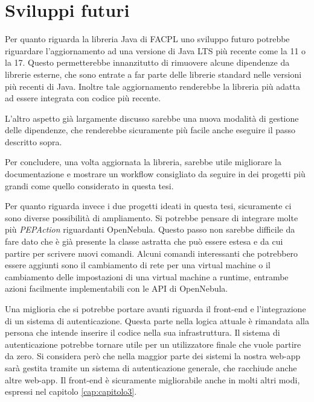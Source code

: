\section{Sviluppi futuri}
Per quanto riguarda la libreria Java di FACPL uno sviluppo futuro potrebbe riguardare l'aggiornamento ad una versione di Java LTS più recente come la 11 o la 17. Questo permetterebbe innanzitutto di rimuovere alcune dipendenze da librerie esterne, che sono entrate a far parte delle librerie standard nelle versioni più recenti di Java. Inoltre tale aggiornamento renderebbe la libreria più adatta ad essere integrata con codice più recente.\par
L'altro aspetto già largamente discusso sarebbe una nuova modalità di gestione delle dipendenze, che renderebbe sicuramente più facile anche eseguire il passo descritto sopra.\par
Per concludere, una volta aggiornata la libreria, sarebbe utile migliorare la documentazione e mostrare un workflow consigliato da seguire in dei progetti più grandi come quello considerato in questa tesi.\par
Per quanto riguarda invece i due progetti ideati in questa tesi, sicuramente ci sono diverse possibilità di ampliamento. Si potrebbe pensare di integrare molte più \emph{PEPAction} riguardanti OpenNebula. Questo passo non sarebbe difficile da fare dato che è già presente la classe astratta che può essere estesa e da cui partire per scrivere nuovi comandi. Alcuni comandi interessanti che potrebbero essere aggiunti sono il cambiamento di rete per una virtual machine o il cambiamento delle impostazioni di una virtual machine a runtime, entrambe azioni facilmente implementabili con le API di OpenNebula.\par

Una miglioria che si potrebbe portare avanti riguarda il front-end e l'integrazione di un sistema di autenticazione. Questa parte nella logica attuale è rimandata alla persona che intende inserire il codice nella sua infrastruttura. Il sistema di autenticazione potrebbe tornare utile per un utilizzatore finale che vuole partire da zero. Si considera però che nella maggior parte dei sistemi la nostra web-app sarà gestita tramite un sistema di autenticazione generale, che racchiude anche altre web-app. Il front-end è sicuramente migliorabile anche in molti altri modi, espressi nel capitolo \ref{cap:capitolo3}.\par